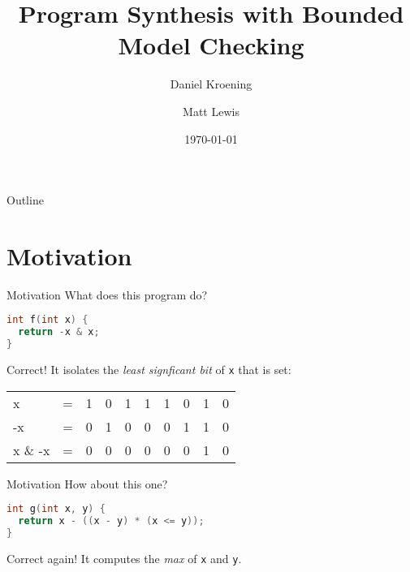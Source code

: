 \documentclass[xcolor=pdftex,t,11pt]{beamer}
\author{Daniel Kroening \and Matt Lewis}
\title{Program Synthesis with Bounded Model Checking}
\institute{Oxford University}
\date{\today}
\begin{document}

\begin{frame}[plain]
  \titlepage
\end{frame}

\begin{frame}{Outline}
  \tableofcontents
\end{frame}

\section{Motivation}


\begin{frame}[fragile]{Motivation}
What does this program do?

\begin{center}
\begin{minipage}{0.3\linewidth}
 \begin{lstlisting}[language=C,basicstyle=\normalsize]
int f(int x) {
  return -x & x;
}
 \end{lstlisting}
\end{minipage}
\end{center}

\pause

Correct!  It isolates the \emph{least signficant bit} of \verb|x| that is set:


\begin{center}
\begin{tabular}{llcccccccc}
 x       & = & 1 & 0 & 1 & 1 & 1 & 0 & 1 & 0 \\
 -x      & = & 0 & 1 & 0 & 0 & 0 & 1 & 1 & 0 \\
 x \& -x & = & 0 & 0 & 0 & 0 & 0 & 0 & 1 & 0
\end{tabular}
\end{center}


\end{frame}

\begin{frame}[fragile]{Motivation}
How about this one?

\begin{center}
\begin{minipage}{0.75\linewidth}
 \begin{lstlisting}[language=C,basicstyle=\normalsize]
int g(int x, y) {
  return x - ((x - y) * (x <= y));
}
 \end{lstlisting}
\end{minipage}
\end{center}

\pause

Correct again!  It computes the \emph{max} of \verb|x| and \verb|y|.
\end{frame}
\end{document}
